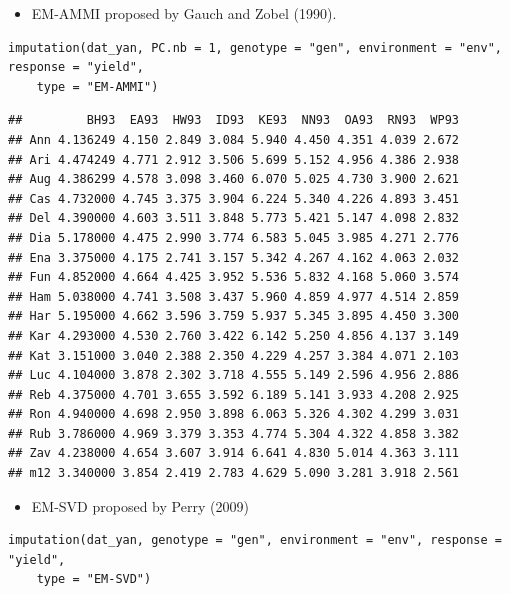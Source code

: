 \begin{itemize}
\item EM-AMMI proposed by Gauch and Zobel (1990).
\end{itemize}
\begin{lstlisting}
imputation(dat_yan, PC.nb = 1, genotype = "gen", environment = "env", response = "yield", 
    type = "EM-AMMI")
\end{lstlisting}

\begin{verbatim}
##         BH93  EA93  HW93  ID93  KE93  NN93  OA93  RN93  WP93
## Ann 4.136249 4.150 2.849 3.084 5.940 4.450 4.351 4.039 2.672
## Ari 4.474249 4.771 2.912 3.506 5.699 5.152 4.956 4.386 2.938
## Aug 4.386299 4.578 3.098 3.460 6.070 5.025 4.730 3.900 2.621
## Cas 4.732000 4.745 3.375 3.904 6.224 5.340 4.226 4.893 3.451
## Del 4.390000 4.603 3.511 3.848 5.773 5.421 5.147 4.098 2.832
## Dia 5.178000 4.475 2.990 3.774 6.583 5.045 3.985 4.271 2.776
## Ena 3.375000 4.175 2.741 3.157 5.342 4.267 4.162 4.063 2.032
## Fun 4.852000 4.664 4.425 3.952 5.536 5.832 4.168 5.060 3.574
## Ham 5.038000 4.741 3.508 3.437 5.960 4.859 4.977 4.514 2.859
## Har 5.195000 4.662 3.596 3.759 5.937 5.345 3.895 4.450 3.300
## Kar 4.293000 4.530 2.760 3.422 6.142 5.250 4.856 4.137 3.149
## Kat 3.151000 3.040 2.388 2.350 4.229 4.257 3.384 4.071 2.103
## Luc 4.104000 3.878 2.302 3.718 4.555 5.149 2.596 4.956 2.886
## Reb 4.375000 4.701 3.655 3.592 6.189 5.141 3.933 4.208 2.925
## Ron 4.940000 4.698 2.950 3.898 6.063 5.326 4.302 4.299 3.031
## Rub 3.786000 4.969 3.379 3.353 4.774 5.304 4.322 4.858 3.382
## Zav 4.238000 4.654 3.607 3.914 6.641 4.830 5.014 4.363 3.111
## m12 3.340000 3.854 2.419 2.783 4.629 5.090 3.281 3.918 2.561
\end{verbatim}



\begin{itemize}
\item EM-SVD proposed by Perry (2009)
\end{itemize}
\begin{lstlisting}
imputation(dat_yan, genotype = "gen", environment = "env", response = "yield", 
    type = "EM-SVD")
\end{lstlisting}

